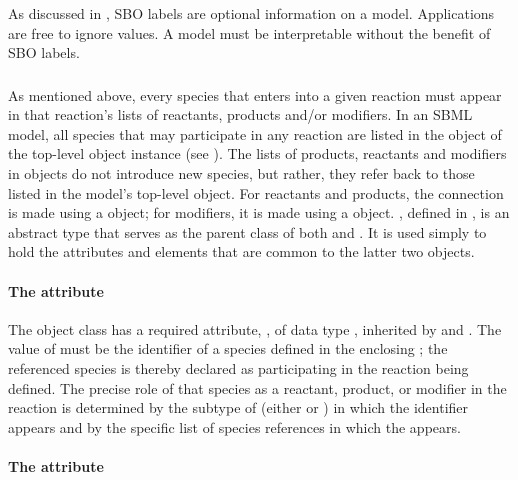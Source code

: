 As discussed in , SBO labels are optional
information on a model.  Applications are free to ignore
 values.  A model must be interpretable without the
benefit of SBO labels.


\subsubsection{}
\label{subsec:simplespeciesreference}

As mentioned above, every species that enters into a given
reaction must appear in that reaction's lists of reactants,
products and/or modifiers.  In an SBML model, all species that may
participate in any reaction are listed in the \ListOfSpecies
object of the top-level \Model object instance (see
).  The lists of products, reactants and
modifiers in \Reaction objects do not introduce new species, but
rather, they refer back to those listed in the model's top-level
\ListOfSpecies object.  For reactants and products, the connection
is made using a \SpeciesReference object; for modifiers, it is
made using a \ModifierSpeciesReference object.
\SimpleSpeciesReference, defined in , is
an abstract type that serves as the parent class of both
\SpeciesReference and \ModifierSpeciesReference.  It is used
simply to hold the attributes and elements that are common to the
latter two objects.


\paragraph{The  attribute}

The \SimpleSpeciesReference object class has a required attribute,
, of data type ,
inherited by \SpeciesReference and
\ModifierSpeciesReference.  The value of  must be
the identifier of a species defined in the enclosing \Model; the
referenced species is thereby declared as participating in the
reaction being defined.  The precise role of that species as a
reactant, product, or modifier in the reaction is determined by
the subtype of \SimpleSpeciesReference (\ie either
\SpeciesReference or \ModifierSpeciesReference) in which the
identifier appears and by the specific list of species references
in which the \SpeciesReference appears.


\paragraph{The  attribute}
\label{sec:simplespeciesreference-sboterm}

